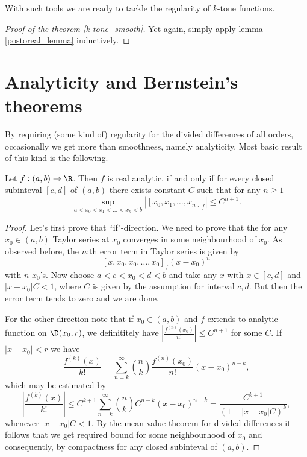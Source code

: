 With such tools we are ready to tackle the regularity of $k$-tone functions.

\begin{proof}[Proof of the theorem \ref{k-tone_smooth}]
	Yet again, simply apply lemma \ref{postoreal_lemma} inductively.
\end{proof}

\section{Analyticity and Bernstein's theorems}

By requiring (some kind of) regularity for the divided differences of all orders, occasionally we get more than smoothness, namely analyticity. Most basic result of this kind is the following.

\begin{lause}\label{div_anal}
	Let $f : (a, b) \to \R$. Then $f$ is real analytic, if and only if for every closed subinteval $[c, d]$ of $(a, b)$ there exists constant $C$ such that for any $n \geq 1$
	\[
		\sup_{a < x_{0} < x_{1} < \ldots < x_{n}< b} |[x_{0}, x_{1}, \ldots, x_{n}]_{f}| \leq C^{n + 1}.
	\]
\end{lause}
\begin{proof}
	Let's first prove that ``if"-direction. We need to prove that the for any $x_{0} \in (a, b)$ Taylor series at $x_{0}$ converges in some neighbourhood of $x_{0}$. As observed before, the $n$:th error term in Taylor series is given by
	\[
		[x, x_{0}, x_{0}, \ldots, x_{0}]_{f} (x - x_{0})^{n}
	\]
	with $n$ $x_{0}$'s. Now choose $a < c < x_{0} < d < b$ and take any $x$ with $x \in [c, d]$ and $|x - x_{0}| C < 1$, where $C$ is given by the assumption for interval $c, d$. But then the error term tends to zero and we are done.

	For the other direction note that if $x_{0} \in (a, b)$ and $f$ extends to analytic function on $\D(x_{0}, r)$, we definititely have $\left|\frac{f^{(n)}(x_{0})}{n!}\right| \leq C^{n + 1}$ for some $C$. If $|x - x_{0}| < r$ we have
	\[
		\frac{f^{(k)}(x)}{k!} = \sum_{n = k}^{\infty} \binom{n}{k} \frac{f^{(n)}(x_{0})}{n!} (x - x_{0})^{n - k},
	\]
	which may be estimated by
	\[
	 \left|\frac{f^{(k)}(x)}{k!}\right| \leq C^{k + 1}\sum_{n = k}^{\infty} \binom{n}{k} C^{n - k} (x - x_{0})^{n - k} = \frac{C^{k + 1} }{(1 - |x - x_{0}| C)^{k}},
	\]
	whenever $|x - x_{0}| C < 1$. By the mean value theorem for divided differences it follows that we get required bound for some neighbourhood of $x_{0}$ and consequently, by compactness for any closed subinteval of $(a, b)$.
\end{proof}

